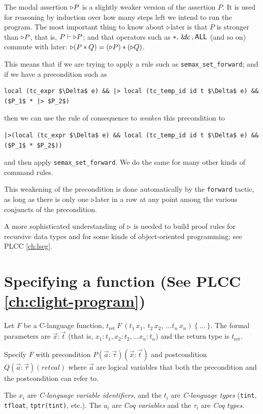 \documentclass[12pt,fleqn,openany,oneside,showtrims]{memoir}
\newcommand{\ychapter}[2]{\chapter[#1]{#1 \hfill \normalsize #2}}
\begin{document}
The modal assertion $\triangleright P$ is a slightly weaker version of the
assertion $P$.  It is used for reasoning by induction over how many
steps left we intend to run the program.  The most important
thing to know about $\triangleright$later is that $P$ is stronger than
$\triangleright P$, that is, $P \vdash \triangleright P$; and that operators such
as $*, \,\mathsf{\&\hspace{-.2em}\&}\,, \mathsf{ALL}$ (and so on) commute with later:
$\triangleright (P*Q)= (\triangleright P) * (\triangleright Q)$.

This means that if we are trying to apply a rule such as
\lstinline{semax_set_forward}; and if we
have a precondition such as
\begin{lstlisting}
local (tc_expr $\Delta$ e) && |> local (tc_temp_id id t $\Delta$ e) && ($P_1$ * |> $P_2$)
\end{lstlisting}
then we can use the rule of consequence to \emph{weaken}
this precondition to
\begin{lstlisting}
|>(local (tc_expr $\Delta$ e) && local (tc_temp_id id t $\Delta$ e) && ($P_1$ * $P_2$))
\end{lstlisting}
and then apply \lstinline{semax_set_forward}.  We do the same for many other kinds of command rules.

This weakening of the precondition is done automatically by the
\lstinline{forward} tactic, as long as there is only one
$\triangleright$later in a row at any point among the various conjuncts of
the precondition.

A more sophisticated understanding of $\triangleright$ is needed to
build proof rules for recursive data types and for
some kinds of object-oriented programming; see PLCC \autoref{ch:lseg}.


\ychapter{Specifying a function}{(See PLCC \autoref{ch:clight-program})}

Let $F$ be a C-language function, $t_\mathrm{ret}~F~(t_1\, x_1,~t_2\, x_2,~\ldots t_n\, x_n)~\{~\ldots~\}$.
\linebreak
The formal parameters are
$\vec{x}:\vec{t}$ (that is, $x_1:t_1, x_2:t_2, \ldots
x_n:t_n$) and the return type is $t_\mathrm{ret}$.

Specify $F$ with precondition $P(\vec{a}:\vec{\tau})(\vec{x}:\vec{t})$
and postcondition
\linebreak $Q(\vec{a}:\vec{\tau})(\mathit{retval})$
where $\vec{a}$ are logical variables that both the
precondition and the postcondition can refer to.

The $x_i$ are \emph{C-language variable identifiers},
and the $t_i$ are \emph{C-language types}
(\lstinline{tint}, \lstinline{tfloat}, \lstinline{tptr(tint)},
etc.).
The $a_i$ are \emph{Coq variables} and the $\tau_i$ are \emph{Coq types}.
\end{document}
